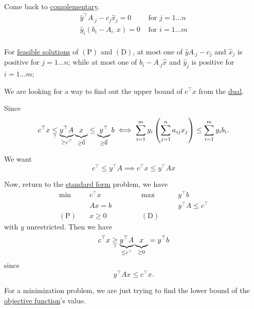 Come back to \hyperref[def:complementary]{complementary}.
\[
	\begin{split}
		\hat{y}^{\top} A_{\cdot j} - c_{j}\hat{x}_j = 0 &\text{ for }j = 1\ldots n\\
		\hat{y}_i(b_{i} - A_{i\cdot }x) = 0 &\text{ for }i = 1\ldots m\\
	\end{split}
\]

\begin{note}
	For \hyperref[def:feasible-solution]{feasible solutions} of \((\mathrm{P})\) and \((\mathrm{D})\), at most one of \(\hat{y}A_{\cdot j} - c_{j}\) and \(\hat{x}_j\) is positive for \(j = 1\ldots n\);
	while at most one of \(b_{i} - A_{\cdot j}\hat{x}\) and \(\hat{y}_j\) is positive for \(i = 1\ldots m\);
\end{note}

\begin{problem}
We are looking for a way to find out the upper bound of \(c^{\top}x\) from the \hyperref[def:dual]{dual}.
\end{problem}
\begin{answer}
	Since
	\[
		c^{\top}x \underset{?}{\leq}
		\underbrace{y^{\top} A }_{\geq c^{\top}}\underbrace{\vphantom{y^{\top}A}x}_{\geq \vec{0}}
		\leq \underbrace{y^{\top}}_{\geq \vec{0}} b
		\iff \sum\limits_{i=1}^{m} y_{i} \left( \sum\limits_{j=1}^{n} a_{ij}x_{j} \right)
		\leq \sum\limits_{i=1}^{m} y_{i}b_{i}.
	\]

	We want
	\[
		c^{\top}\leq y^{\top}A\implies c^{\top}x\leq y^{\top} Ax
	\]

	Now, return to the \hyperref[def:standard-form]{standard form} problem, we have
	\[
		\begin{alignedat}{5}
			\min~&c^{\top}x\qquad\qquad &&\max ~ &&y^{\top}b\\
			&Ax = b && &&y^{\top}A\leq c^{\top}\\
			(\mathrm{P})\quad&x\geq  0 &&(\mathrm{D})\quad&&
		\end{alignedat}
	\]
	with \(y\) unrestricted. Then we have
	\[
		c^{\top}x\underset{?}{\geq} \underbrace{y^{\top}A}_{\leq c^{\top}}\underbrace{\vphantom{y^{\top}A}x}_{\geq 0} = y^{\top} b
	\]
	since \[
		y^{\top}Ax\leq c^{\top}x.
	\]
\end{answer}

\begin{intuition}
	For a minimization problem, we are just trying to find the lower bound of the \hyperref[def:objective-function]{objective function}'s value.
\end{intuition}


